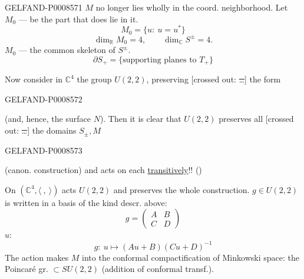 \begin{GelfandAdjacentEvidence}{GELFAND-P000857}{1}
\(M\) no longer lies wholly in the coord. neighborhood. Let \(M_0\) — be the part that does lie in it.
\[
M_0=\{u:\ u=u^*\}\tag{18}
\]
\[
\dim_{\mathbb R} M_0=4,\qquad \dim_{\mathbb C} S^\pm=4.
\]
\(M_0\) — the common skeleton of \(S^\pm\).
\[
\partial S_+=\{\text{supporting planes to }T_+\}
\]

Now consider in \(\mathbb C^4\) the group \(U(2,2)\), preserving
[crossed out: \sout{…}] the form
\end{GelfandAdjacentEvidence}
\begin{GelfandAdjacentEvidence}{GELFAND-P000857}{2}

(and, hence, the surface \(N\)). Then it is clear that \(U(2,2)\) preserves all
[crossed out: \sout{…}] the domains \(S_{\pm},M\)
\end{GelfandAdjacentEvidence}
\begin{GelfandAdjacentEvidence}{GELFAND-P000857}{3}

(canon. construction) and acts on each \uline{transitively}!!
()

On \((\mathbb C^4,\langle\ ,\ \rangle)\) acts \(U(2,2)\)
and preserves the whole construction.
\(g\in U(2,2)\) is written in a basis of the kind descr. above:
\[
g=\begin{pmatrix}A&B\\C&D\end{pmatrix}\tag{19}
\]
 \(u\):
\[
g:\ u\mapsto (Au+B)(Cu+D)^{-1}\tag{20}
\]
The action makes \(M\) into the conformal compactification of Minkowski space:
the Poincaré gr. \(\subset SU(2,2)\) (addition of conformal transf.).

\end{GelfandAdjacentEvidence}
